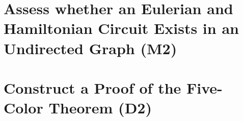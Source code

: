 \documentclass[12pt, a4paper, twoside]{report} %
\begin{document}







\section{Assess whether an Eulerian and Hamiltonian Circuit Exists in an Undirected Graph (M2)}
\label{sec:M2}



\section{Construct a Proof of the Five-Color Theorem (D2)}
\label{sec:D2}

\end{document}
